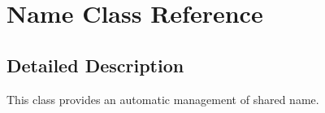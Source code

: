 \hypertarget{class_name}{}\section{Name Class Reference}
\label{class_name}


\subsection{Detailed Description}
This class provides an automatic management of shared name. 